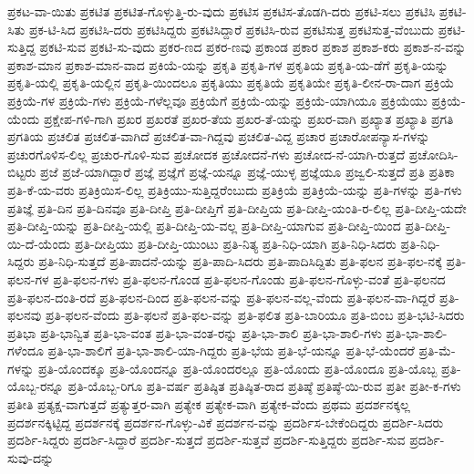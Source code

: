 {ಪ್ರಕಟ-ವಾ-ಯಿತು
ಪ್ರಕಟಿತ
ಪ್ರಕಟಿತ-ಗೊಳ್ಳುತ್ತಿ-ರು-ವುದು
ಪ್ರಕಟಿಸ
ಪ್ರಕಟಿಸ-ತೊಡಗಿ-ದರು
ಪ್ರಕಟಿ-ಸಲು
ಪ್ರಕಟಿಸಿ
ಪ್ರಕಟಿ-ಸಿತು
ಪ್ರಕ-ಟಿ-ಸಿದ
ಪ್ರಕಟಿಸಿ-ದರು
ಪ್ರಕಟಿಸಿದ್ದರು
ಪ್ರಕಟಿಸಿದ್ದಾರೆ
ಪ್ರಕಟಿಸಿ-ರುವ
ಪ್ರಕಟಿಸುತ್ತ
ಪ್ರಕಟಿಸುತ್ತ-ವೆಂಬುದು
ಪ್ರಕಟಿ-ಸುತ್ತಿದ್ದ
ಪ್ರಕಟಿ-ಸುವ
ಪ್ರಕಟಿ-ಸು-ವುದು
ಪ್ರಕರ-ಣದ
ಪ್ರಕರ-ಣವು
ಪ್ರಕಾಂಡ
ಪ್ರಕಾರ
ಪ್ರಕಾಶ
ಪ್ರಕಾಶ-ಕರು
ಪ್ರಕಾಶ-ನ-ವನ್ನು
ಪ್ರಕಾಶ-ಮಾನ
ಪ್ರಕಾಶ-ಮಾನ-ವಾದ
ಪ್ರಕಿಯೆ-ಯನ್ನು
ಪ್ರಕೃತಿ
ಪ್ರಕೃತಿ-ಗಳ
ಪ್ರಕೃತಿಯ
ಪ್ರಕೃತಿ-ಯ-ಡೆಗೆ
ಪ್ರಕೃತಿ-ಯನ್ನು
ಪ್ರಕೃತಿ-ಯಲ್ಲಿ
ಪ್ರಕೃತಿ-ಯಲ್ಲಿನ
ಪ್ರಕೃತಿ-ಯಿಂದಲೂ
ಪ್ರಕೃತಿಯು
ಪ್ರಕೃತಿಯೆ
ಪ್ರಕೃತಿಯೇ
ಪ್ರಕೃತಿ-ಲೀನ-ರಾ-ದಾಗ
ಪ್ರಕ್ರಿಯೆ
ಪ್ರಕ್ರಿಯೆ-ಗಳ
ಪ್ರಕ್ರಿಯೆ-ಗಳು
ಪ್ರಕ್ರಿಯೆ-ಗಳೆಲ್ಲವೂ
ಪ್ರಕ್ರಿಯೆಗೆ
ಪ್ರಕ್ರಿಯೆ-ಯನ್ನು
ಪ್ರಕ್ರಿಯೆ-ಯಾಗಿಯೂ
ಪ್ರಕ್ರಿಯೆಯು
ಪ್ರಕ್ರಿಯೆ-ಯೆಂದು
ಪ್ರಕ್ಷೇಪ-ಗಳಿ-ಗಾಗಿ
ಪ್ರಖರ
ಪ್ರಖರತೆ
ಪ್ರಖರ-ತೆಯ
ಪ್ರಖರ-ತೆ-ಯನ್ನು
ಪ್ರಖರ-ವಾಗಿ
ಪ್ರಖ್ಯಾತ
ಪ್ರಖ್ಯಾತಿ
ಪ್ರಗತಿ
ಪ್ರಗತಿಯ
ಪ್ರಚಲಿತ
ಪ್ರಚಲಿತ-ವಾಗಿದೆ
ಪ್ರಚಲಿತ-ವಾ-ಗಿದ್ದವು
ಪ್ರಚಲಿತ-ವಿದ್ದ
ಪ್ರಚಾರ
ಪ್ರಚಾರೋಪನ್ಯಾಸ-ಗಳನ್ನು
ಪ್ರಚುರಗೊಳಿಸ-ಲಿಲ್ಲ
ಪ್ರಚುರ-ಗೊಳಿ-ಸುವ
ಪ್ರಚೋದಕ
ಪ್ರಚೋದನೆ-ಗಳು
ಪ್ರಚೋದ-ನೆ-ಯಾಗಿ-ರುತ್ತದೆ
ಪ್ರಚೋದಿಸಿ-ಬಿಟ್ಟರು
ಪ್ರಜೆ
ಪ್ರಜೆ-ಯಾಗಿದ್ದಾರೆ
ಪ್ರಜ್ಞೆ
ಪ್ರಜ್ಞೆಗೆ
ಪ್ರಜ್ಞೆ-ಯನ್ನೂ
ಪ್ರಜ್ಞೆ-ಯುಳ್ಳ
ಪ್ರಜ್ಞೆಯೂ
ಪ್ರಜ್ವಲಿ-ಸುತ್ತದೆ
ಪ್ರತಿ
ಪ್ರತಿಕಾ
ಪ್ರತಿ-ಕೆ-ಯ-ವರು
ಪ್ರತಿಕ್ರಿಯಿಸ-ಲಿಲ್ಲ
ಪ್ರತಿಕ್ರಿಯು-ಸುತ್ತಿದ್ದರೆಂಬುದು
ಪ್ರತಿಕ್ರಿಯೆ
ಪ್ರತಿಕ್ರಿಯೆ-ಯನ್ನು
ಪ್ರತಿ-ಗಳನ್ನು
ಪ್ರತಿ-ಗಳು
ಪ್ರತಿಜ್ಞೆ
ಪ್ರತಿ-ದಿನ
ಪ್ರತಿ-ದಿನವೂ
ಪ್ರತಿ-ದೀಪ್ತಿ
ಪ್ರತಿ-ದೀಪ್ತಿಗೆ
ಪ್ರತಿ-ದೀಪ್ತಿಯ
ಪ್ರತಿ-ದೀಪ್ತಿ-ಯಂತಿ-ರ-ಲಿಲ್ಲ
ಪ್ರತಿ-ದೀಪ್ತಿ-ಯದೇ
ಪ್ರತಿ-ದೀಪ್ತಿ-ಯನ್ನು
ಪ್ರತಿ-ದೀಪ್ತಿ-ಯಲ್ಲಿ
ಪ್ರತಿ-ದೀಪ್ತಿ-ಯ-ವಲ್ಲ
ಪ್ರತಿ-ದೀಪ್ತಿ-ಯಾಗುವ
ಪ್ರತಿ-ದೀಪ್ತಿ-ಯಿಂದ
ಪ್ರತಿ-ದೀಪ್ತಿ-ಯಿ-ದೆ-ಯೆಂದು
ಪ್ರತಿ-ದೀಪ್ತಿಯು
ಪ್ರತಿ-ದೀಪ್ತಿ-ಯುಂಟು
ಪ್ರತಿ-ನಿತ್ಯ
ಪ್ರತಿ-ನಿಧಿ-ಯಾಗಿ
ಪ್ರತಿ-ನಿಧಿ-ಸಿದರು
ಪ್ರತಿ-ನಿಧಿ-ಸಿದ್ದರು
ಪ್ರತಿ-ನಿಧಿ-ಸುತ್ತದೆ
ಪ್ರತಿ-ಪಾದನೆ-ಯನ್ನು
ಪ್ರತಿ-ಪಾದಿ-ಸಿದರು
ಪ್ರತಿ-ಪಾದಿಸಿದ್ದಿತು
ಪ್ರತಿ-ಫಲನ
ಪ್ರತಿ-ಫಲ-ನಕ್ಕೆ
ಪ್ರತಿ-ಫಲನ-ಗಳ
ಪ್ರತಿ-ಫಲನ-ಗಳು
ಪ್ರತಿ-ಫಲನ-ಗೊಂಡ
ಪ್ರತಿ-ಫಲನ-ಗೊಂಡು
ಪ್ರತಿ-ಫಲನ-ಗೊಳ್ಳು-ವಂತೆ
ಪ್ರತಿ-ಫಲನದ
ಪ್ರತಿ-ಫಲನ-ದಂತಿ-ರದೆ
ಪ್ರತಿ-ಫಲನ-ದಿಂದ
ಪ್ರತಿ-ಫಲನ-ವನ್ನು
ಪ್ರತಿ-ಫಲನ-ವಲ್ಲ-ವೆಂದು
ಪ್ರತಿ-ಫಲನ-ವಾ-ಗಿದ್ದರೆ
ಪ್ರತಿ-ಫಲನವು
ಪ್ರತಿ-ಫಲನ-ವೆಂದು
ಪ್ರತಿ-ಫಲನೆ
ಪ್ರತಿ-ಫಲ-ವನ್ನು
ಪ್ರತಿ-ಫಲಿತ
ಪ್ರತಿ-ಬಾರಿಯೂ
ಪ್ರತಿ-ಬಿಂಬ
ಪ್ರತಿ-ಭಟಿ-ಸಿದರು
ಪ್ರತಿಭಾ
ಪ್ರತಿ-ಭಾನ್ವಿತ
ಪ್ರತಿ-ಭಾ-ವಂತ
ಪ್ರತಿ-ಭಾ-ವಂತ-ರನ್ನು
ಪ್ರತಿ-ಭಾ-ಶಾಲಿ
ಪ್ರತಿ-ಭಾ-ಶಾಲಿ-ಗಳು
ಪ್ರತಿ-ಭಾ-ಶಾಲಿ-ಗಳೆಂದೂ
ಪ್ರತಿ-ಭಾ-ಶಾಲಿಗೆ
ಪ್ರತಿ-ಭಾ-ಶಾಲಿ-ಯಾ-ಗಿದ್ದರು
ಪ್ರತಿ-ಭೆಯ
ಪ್ರತಿ-ಭೆ-ಯನ್ನೂ
ಪ್ರತಿ-ಭೆ-ಯೆಂದರೆ
ಪ್ರತಿ-ಮೆ-ಗಳನ್ನು
ಪ್ರತಿ-ಯೊಂದಕ್ಕೂ
ಪ್ರತಿ-ಯೊಂದನ್ನೂ
ಪ್ರತಿ-ಯೊಂದರಲ್ಲೂ
ಪ್ರತಿ-ಯೊಂದು
ಪ್ರತಿ-ಯೊಂದೂ
ಪ್ರತಿ-ಯೊಬ್ಬ
ಪ್ರತಿ-ಯೊಬ್ಬ-ರನ್ನೂ
ಪ್ರತಿ-ಯೊಬ್ಬ-ರಿಗೂ
ಪ್ರತಿ-ವರ್ಷ
ಪ್ರತಿಷ್ಠಿತ
ಪ್ರತಿಷ್ಠಿತ-ರಾದ
ಪ್ರತಿಷ್ಠೆ
ಪ್ರತಿಷ್ಠೆ-ಯಿ-ರುವ
ಪ್ರತೀ
ಪ್ರತೀ-ಕ-ಗಳು
ಪ್ರತೀತಿ
ಪ್ರತ್ಯಕ್ಷ-ವಾಗುತ್ತದೆ
ಪ್ರತ್ಯುತ್ತರ-ವಾಗಿ
ಪ್ರತ್ಯೇಕ
ಪ್ರತ್ಯೇಕ-ವಾಗಿ
ಪ್ರತ್ಯೇಕ-ವೆಂದು
ಪ್ರಥಮ
ಪ್ರದರ್ಶನಕ್ಕಲ್ಲ
ಪ್ರದರ್ಶನಕ್ಕಿಟ್ಟಿದ್ದ
ಪ್ರದರ್ಶನಕ್ಕೆ
ಪ್ರದರ್ಶನ-ಗೊಳ್ಳು-ವಿಕೆ
ಪ್ರದರ್ಶನ-ವನ್ನು
ಪ್ರದರ್ಶಿಸ-ಬೇಕೆಂದಿದ್ದರು
ಪ್ರದರ್ಶಿ-ಸಿದರು
ಪ್ರದರ್ಶಿ-ಸಿದ್ದರು
ಪ್ರದರ್ಶಿ-ಸಿದ್ದಾರೆ
ಪ್ರದರ್ಶಿ-ಸುತ್ತದೆ
ಪ್ರದರ್ಶಿ-ಸುತ್ತವೆ
ಪ್ರದರ್ಶಿ-ಸುತ್ತಿದ್ದರು
ಪ್ರದರ್ಶಿ-ಸುವ
ಪ್ರದರ್ಶಿ-ಸುವು-ದನ್ನು
}
